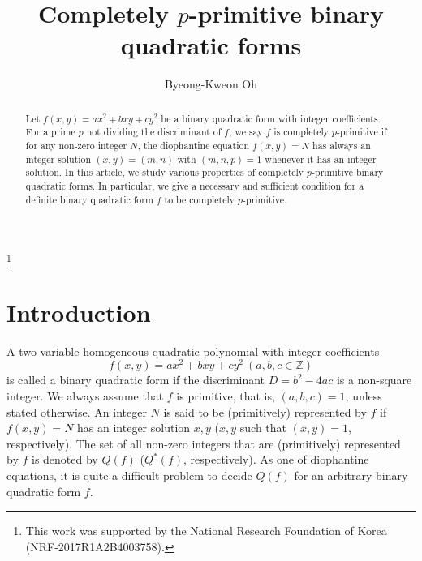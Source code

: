 \documentclass{amsart}
\theoremstyle{definition}
\theoremstyle{remark}
\numberwithin{equation}{section}
\begin{document}
\title{Completely $p$-primitive  binary quadratic forms}

\author{Byeong-Kweon Oh }

\address{Department of Mathematical Sciences and Research Institute of Mathematics, Seoul National University, Seoul 08826, Korea}
\thanks{This work  was supported by the National Research Foundation of Korea (NRF-2017R1A2B4003758).}



\begin{abstract} Let $f(x,y)=ax^2+bxy+cy^2$ be a binary quadratic form with integer coefficients. For a prime $p$ not dividing the discriminant of $f$, we say $f$ is completely $p$-primitive if for any non-zero integer $N$,  the diophantine equation $f(x,y)=N$ has always an integer solution $(x,y)=(m,n)$ with  $(m,n,p)=1$ whenever it has an integer solution. In this article, we study various properties of completely $p$-primitive binary quadratic forms. In particular, we give a necessary and sufficient condition for a definite binary quadratic form $f$ to be completely $p$-primitive.
 
\end{abstract}

\maketitle \pagestyle{myheadings}

\maketitle

\section{Introduction}  A two variable homogeneous quadratic  polynomial with integer coefficients
$$
f(x,y)=ax^2+bxy+cy^2 \ (a,b,c \in {{\mathbb Z}})
$$ 
is called a binary quadratic form if the discriminant $D=b^2-4ac$ is a non-square integer.  We always  assume that $f$ is primitive, that is, $(a,b,c)=1$, unless stated otherwise.  An integer $N$ is said to be (primitively) represented by $f$ if $f(x,y)=N$ has an integer solution $x,y$ ($x,y$ such that $(x,y)=1$, respectively). The set of all non-zero integers that are (primitively) represented by $f$ is denoted by $Q(f)$ ($Q^*(f)$, respectively). As one of diophantine equations, it is quite a difficult problem to decide $Q(f)$ for  an arbitrary binary quadratic form $f$.   
\end{document}
